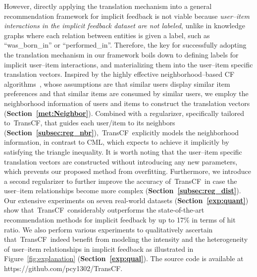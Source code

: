 \documentclass[conference]{IEEEtran}
\newcommand{\propose}{\textsf{{TransCF}}}
\begin{document}
However, directly applying the translation mechanism into a general recommendation framework for implicit feedback is not viable because \textit{user--item interactions in the implicit feedback dataset are not labeled}, unlike in knowledge graphs where each relation between entities is given a label, such as {``was\_born\_in''} or {``performed\_in''}.
Therefore, the key for successfully adopting the translation mechanism in our framework boils down to
defining labels for implicit user--item interactions, and materializing them into the user--item specific translation vectors.
Inspired by the highly effective neighborhood--based CF algorithms~\cite{koren2008factorization,kabbur2013fism,wu2016collaborative,ning2011slim,desrosiers2011comprehensive,sarwar2001item}, whose assumptions are that similar users display similar item preferences and that similar items are consumed by similar users, we employ the neighborhood information of users and items to construct the translation vectors (\textbf{Section~\ref{met:Neighbor}}).
Combined with a regularizer, specifically tailored to~\propose, that guides each user/item to its neighbors (\textbf{Section~\ref{subsec:reg_nbr}}),~\propose~explicitly models the neighborhood information, in contrast to CML, which expects to achieve it implicitly by satisfying the triangle inequality. 
It is worth noting that {the user--item specific translation vectors are constructed without introducing any new parameters}, which prevents our proposed method from overfitting.
Furthermore, we introduce a second regularizer to further improve the accuracy of~\propose~in case the user--item relationships become more complex (\textbf{Section~\ref{subsec:reg_dist}}). 
Our extensive experiments on seven real-world datasets (\textbf{Section~\ref{exp:quant}}) show that~\propose~considerably outperforms the state-of-the-art recommendation methods for implicit feedback by up to 17\% in terms of hit ratio. We also perform various experiments to qualitatively ascertain that~\propose~indeed benefit from modeling the intensity and the heterogeneity of user--item relationships in implicit feedback as illustrated in Figure~\ref{fig:explanation} (\textbf{Section~\ref{exp:qual}}).  The source code is available at https://github.com/pcy1302/TransCF.
\end{document}
